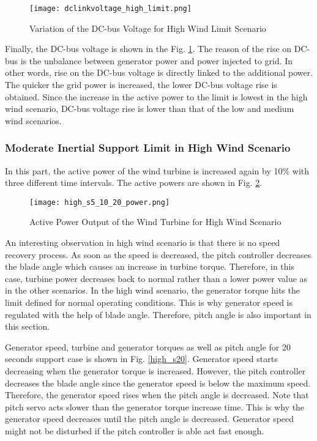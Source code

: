 \begin{figure}[h!]
	\centering
	\texttt{[image: dclinkvoltage\_high\_limit.png]}
	\caption{Variation of the DC-bus Voltage for High Wind Limit Scenario}
	\label{high_limit_dcbus}
\end{figure}
Finally, the DC-bus voltage is shown in the Fig. \ref{high_limit_dcbus}. The reason of the rise on DC-bus is the unbalance between generator power and power injected to grid. In other words, rise on the DC-bus voltage is directly linked to the additional power. The quicker the grid power is increased, the lower DC-bus voltage rise is obtained. Since the increase in the active power to the limit is lowest in the high wind scenario, DC-bus voltage rise is lower than that of the low and medium wind scenarios. \par
\subsubsection{Moderate Inertial Support Limit in High Wind Scenario}
In this part, the active power of the wind turbine is increased again by 10\% with three different time intervals. The active powers are shown in Fig. \ref{high_powerss}.\par
\begin{figure}[h!]
	\centering
	\texttt{[image: high\_s5\_10\_20\_power.png]}
	\caption{Active Power Output of the Wind Turbine for High Wind Scenario}
	\label{high_powerss}
\end{figure}
An interesting observation in high wind scenario is that there is no speed recovery process. As soon as the speed is decreased, the pitch controller decreases the blade angle which causes an increase in turbine torque. Therefore, in this case, turbine power decreases back to normal rather than a lower power value as in the other scenarios. In the high wind scenario, the generator torque hits the limit defined for normal operating conditions. This is why generator speed is regulated with the help of blade angle. Therefore, pitch angle is also important in this section. \par
Generator speed, turbine and generator torques as well as pitch angle for 20 seconds support case is shown in Fig. \ref{high_s20}. Generator speed starts decreasing when the generator torque is increased. However, the pitch controller decreases the blade angle since the generator speed is below the maximum speed. Therefore, the generator speed rises when the pitch angle is decreased. Note that pitch servo acts slower than the generator torque increase time. This is why the generator speed decreases until the pitch angle is decreased. Generator speed might not be disturbed if the pitch controller is able act fast enough.\par
